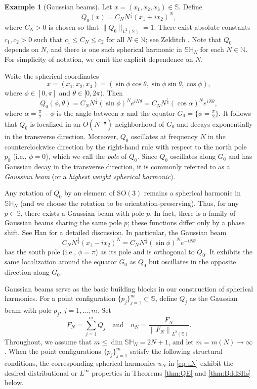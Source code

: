 \documentclass[12pt,reqno]{amsart}
\newcommand{\N}{\mathbb{N}}
\newcommand{\Sb}{\mathbb{S}}
\newcommand{\SH}{\mathbb{SH}}
\newcommand{\SO}{\mathrm{SO}}
\theoremstyle{plain}
\theoremstyle{definition}
\newtheorem*{ex}{Example}
\theoremstyle{remark}
\numberwithin{equation}{section}
\begin{document}
\begin{ex}[Gaussian beams]
Let $x=(x_1,x_2,x_3)\in\Sb$. Define
\begin{equation}\label{eq:Q0}
Q_0(x)=C_NN^\frac14\left(x_1+ix_2\right)^N,
\end{equation}
where $C_N>0$ is chosen so that $\|Q_0\|_{L^2(\Sb)}=1$. There exist absolute constants $c_1,c_2>0$ such that $c_1\le C_N\le c_2$ for all $N\in\N$; see Zelditch \cite[Section 4.4.5]{Ze4}. Note that $Q_0$ depends on $N$, and there is one such spherical harmonic in $\SH_N$ for each $N\in\N$. For simplicity of notation, we omit the explicit dependence on $N$.

Write the spherical coordinates
$$x=\left(x_1,x_2,x_3\right)=(\sin\phi\cos\theta,\sin\phi\sin\theta,\cos\phi),$$
where $\phi\in[0,\pi]$ and $\theta\in[0,2\pi)$. Then
\begin{equation}\label{eq:Q0polar}
Q_0(\phi,\theta)=C_NN^\frac14(\sin\phi)^Ne^{iN\theta}=C_NN^\frac14(\cos\alpha)^Ne^{iN\theta},
\end{equation}
where $\alpha=\frac\pi2-\phi$ is the angle between $x$ and the equator $G_0=\{\phi=\frac\pi2\}$. It follows that $Q_0$ is localized in an $O(N^{-\frac12})$-neighborhood of $G_0$ and decays exponentially in the transverse direction. Moreover, $Q_0$ oscillates at frequency $N$ in the counterclockwise direction by the right-hand rule with respect to the north pole $p_0$ (i.e., $\phi=0$), which we call the \textit{pole} of $Q_0$. Since $Q_0$ oscillates along $G_0$ and has Gaussian decay in the transverse direction, it is commonly referred to as a \textit{Gaussian beam} (or a \textit{highest weight spherical harmonic}).

Any rotation of $Q_0$ by an element of $\SO(3)$ remains a spherical harmonic in $\SH_N$ (and we choose the rotation to be orientation-preserving). Thus, for any $p\in\Sb$, there exists a Gaussian beam with pole $p$. In fact, there is a family of Gaussian beams sharing the same pole $p$; these functions differ only by a phase shift. See Han \cite[Section 2]{Ha1} for a detailed discussion. In particular, the Gaussian beam
$$C_NN^\frac14\left(x_1-ix_2\right)^N=C_NN^\frac14(\sin\phi)^Ne^{-iN\theta}$$
has the south pole (i.e., $\phi=\pi$) as its pole and is orthogonal to $Q_0$. It exhibits the same localization around the equator $G_0$ as $Q_0$ but oscillates in the opposite direction along $G_0$.
\end{ex}

Gaussian beams serve as the basic building blocks in our construction of spherical harmonics. For a point configuration $\{p_j\}_{j=1}^m\subset\Sb$, define $Q_j$ as the Gaussian beam with pole $p_j$, $j=1,...,m$. Set
\begin{equation}\label{eq:uN}
F_N=\sum_{j=1}^mQ_j\quad\text{and}\quad u_N=\frac{F_N}{\left\|F_N\right\|_{L^2(\Sb)}}.
\end{equation}
Throughout, we assume that $m\le\dim\SH_N=2N+1$, and let $m=m(N)\to\infty$. When the point configurations $\{p_j\}_{j=1}^m$ satisfy the following structural conditions, the corresponding spherical harmonics $u_N$ in \eqref{eq:uN} exhibit the desired distributional or $L^\infty$ properties in Theorems \ref{thm:QE} and \ref{thm:BddSHs} below.
\end{document}
